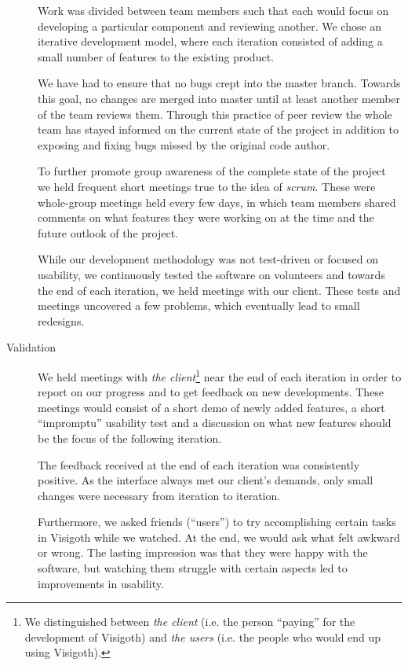\documentclass[a4paper,11pt]{article}
\begin{document}
\begin{description}
  Work was divided between team members such that each would focus on
  developing a particular component and reviewing another. We chose an
  iterative development model, where each iteration consisted of
  adding a small number of features to the existing product.

  We have had to ensure that no bugs crept into the master
  branch. Towards this goal, no changes are merged into master until
  at least another member of the team reviews them. Through this
  practice of peer review the whole team has stayed informed on the
  current state of the project in addition to exposing and fixing bugs
  missed by the original code author.

  To further promote group awareness of the complete state of the
  project we held frequent short meetings true to the idea of
  \emph{scrum}. These were whole-group meetings held every few days,
  in which team members shared comments on what features they were
  working on at the time and the future outlook of the project.

  While our development methodology was not test-driven or focused on
  usability, we continuously tested the software on volunteers and
  towards the end of each iteration, we held meetings with our
  client. These tests and meetings uncovered a few problems, which
  eventually lead to small redesigns.

\item[Validation]

  We held meetings with \emph{the client}\footnote{We distinguished
    between \emph{the client} (i.e.  the person ``paying'' for the
    development of Visigoth) and \emph{the users} (i.e. the people who
    would end up using Visigoth).} near the end of each iteration in
  order to report on our progress and to get feedback on new
  developments. These meetings would consist of a short demo of newly
  added features, a short ``impromptu'' usability test and a
  discussion on what new features should be the focus of the following
  iteration.

  The feedback received at the end of each iteration was consistently
  positive. As the interface always met our client's demands, only
  small changes were necessary from iteration to iteration.

  Furthermore, we asked friends (``users'') to try accomplishing
  certain tasks in Visigoth while we watched. At the end, we would ask
  what felt awkward or wrong. The lasting impression was that they
  were happy with the software, but watching them struggle with
  certain aspects led to improvements in usability.


\end{description}
\end{document}
